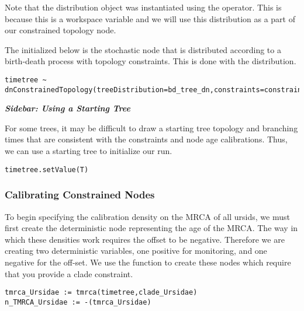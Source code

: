 Note that the distribution object  was instantiated using the \cl{=} operator. This is because this is a workspace variable and we will use this distribution as a part of our constrained topology node.

The  initialized below is the stochastic node that is distributed according to a birth-death process with topology constraints. This is done with the  distribution.

{\tt \begin{snugshade*}
\begin{lstlisting}
timetree ~ dnConstrainedTopology(treeDistribution=bd_tree_dn,constraints=constraints)
\end{lstlisting}
\end{snugshade*}}

\begin{framed}
\textbf{\textit{Sidebar: Using a Starting Tree}}

For some trees, it may be difficult to draw a starting tree topology and branching times that are consistent with the constraints and node age calibrations. 
Thus, we can use a starting tree to initialize our run.

{\tt \begin{snugshade*}
\begin{lstlisting}
timetree.setValue(T)
\end{lstlisting}
\end{snugshade*}}

\end{framed}

\subsubsection{Calibrating Constrained Nodes}




To begin specifying the calibration density on the MRCA of all ursids, we must first create the deterministic node representing the age of the MRCA.
The way in which these densities work requires the offset to be negative. 
Therefore we are creating two deterministic variables, one positive for monitoring, and one negative for the off-set.
We use the  function to create these nodes which require that you provide a clade constraint.
{\tt \begin{snugshade*}
\begin{lstlisting}
tmrca_Ursidae := tmrca(timetree,clade_Ursidae)
n_TMRCA_Ursidae := -(tmrca_Ursidae)
\end{lstlisting}
\end{snugshade*}}


